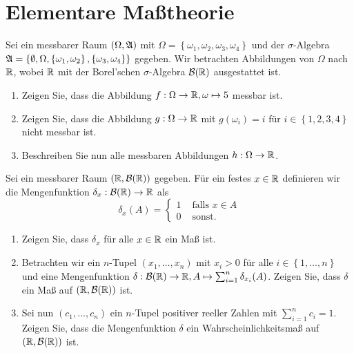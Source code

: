 \section{Elementare Maßtheorie}

 Sei ein messbarer Raum
$(\Omega, \mathfrak A)$ mit $\Omega=\left\{ \omega_1, \omega_2, \omega_3, \omega_4
\right\}$ und der $\sigma$-Algebra $\mathfrak A = \left\{ \emptyset, \Omega, \left\{
\omega_1, \omega_2 \right\}, \left\{ \omega_3, \omega_4 \right\} \right\}$
gegeben. Wir betrachten Abbildungen von $\Omega$ nach $\mathbb R$, wobei $\mathbb R$ mit
der Borel'schen $\sigma$-Algebra $\mathcal B(\mathbb R)$ ausgestattet ist.
\begin{enumerate}
    \item Zeigen Sie, dass die Abbildung $f: \Omega \to \mathbb R, \omega \mapsto 5$
        messbar ist.
    \item Zeigen Sie, dass die Abbildung $g: \Omega \to \mathbb R$ mit $g(\omega_i) = i$
        für $i\in \left\{ 1,2,3,4 \right\}$ nicht messbar ist.
    \item Beschreiben Sie nun alle messbaren Abbildungen $h: \Omega \to \mathbb R$. 
\end{enumerate}



 Sei ein messbarer Raum $(\mathbb R, \mathcal B(\mathbb R))$
gegeben. Für ein festes $x\in\mathbb R$ definieren wir die Mengenfunktion $\delta_x
: \mathcal B(\mathbb R) \to \mathbb{R}$ als
\begin{equation*}
    \delta_{x} (A) =
        \begin{cases}
            1 & \textrm{ falls } x\in A \\
            0 & \textrm{ sonst. }
        \end{cases}
\end{equation*}
\begin{enumerate}
    \item Zeigen Sie, dass $\delta_x$ für alle $x\in\mathbb R$ ein Maß ist.

    \item Betrachten wir ein $n$-Tupel $(x_1, \dots, x_n)$ mit $x_i>0$ für
        alle $i\in \left\{ 1, \dots, n \right\}$ und eine Mengenfunktion
        $\delta: \mathcal B(\mathbb R) \to \mathbb R, A \mapsto \sum_{i=1}^{n} \delta_{x_i} (A)$.
        Zeigen Sie, dass $\delta$ ein Maß auf $\left( \mathbb R, \mathcal B(\mathbb R)
        \right)$ ist.

    \item Sei nun $(c_1, \dots, c_n)$ ein $n$-Tupel positiver reeller Zahlen
        mit $\sum_{i=1}^{n} c_i = 1$. Zeigen Sie, dass die Mengenfunktion
        $\delta$ ein Wahrscheinlichkeitsmaß auf $\left( \mathbb R, \mathcal B(\mathbb R) \right)$
        ist. 
\end{enumerate}




